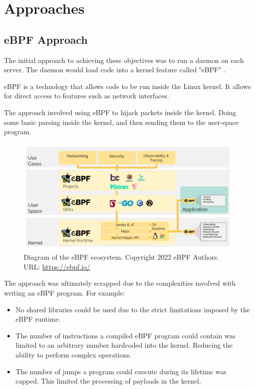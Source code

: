 \documentclass[a4paper,12pt]{report}
\begin{document}
\section{Approaches}
\subsection{eBPF Approach}
\label{sec:ebpf}
The initial approach to achieving these objectives was to run a daemon on each server. The daemon would load code into a kernel feature called "eBPF" \cite{ebpf}.

eBPF is a technology that allows code to be run inside the Linux kernel. It allows for direct access to features such as network interfaces.

The approach involved using eBPF to hijack packets inside the kernel. Doing some basic parsing inside the kernel, and then sending them to the user-space program.

\begin{figure}[hbt!]
    \centering
    \includegraphics[width=\linewidth]{ebpf.png}
    \caption{Diagram of the eBPF ecosystem. Copyright 2022 eBPF Authors. URL: \href{https://ebpf.io/}{https://ebpf.io/}}
\end{figure}
\newpage

The approach was ultimately scrapped due to the complexities involved with writing an eBPF program. For example:

\begin{itemize}
    \item No shared libraries could be used due to the strict limitations imposed by the eBPF runtime.
    \item The number of instructions a compiled eBPF program could contain was limited to an arbitrary number hardcoded into the kernel. Reducing the ability to perform complex operations.
    \item The number of jumps a program could execute during its lifetime was capped. This limited the processing of payloads in the kernel.
\end{itemize}
\end{document}
